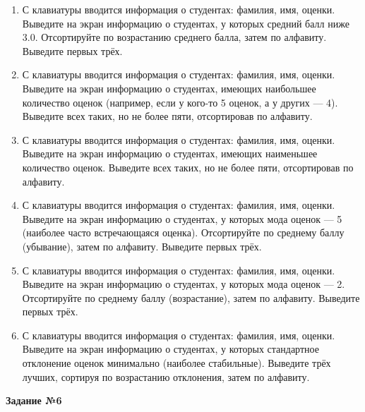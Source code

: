 \begin{enumerate}
\item С клавиатуры вводится информация о студентах: фамилия, имя, оценки. Выведите на экран информацию о студентах, у которых средний балл ниже 3.0. Отсортируйте по возрастанию среднего балла, затем по алфавиту. Выведите первых трёх.
\item С клавиатуры вводится информация о студентах: фамилия, имя, оценки. Выведите на экран информацию о студентах, имеющих наибольшее количество оценок (например, если у кого-то 5 оценок, а у других — 4). Выведите всех таких, но не более пяти, отсортировав по алфавиту.
\item С клавиатуры вводится информация о студентах: фамилия, имя, оценки. Выведите на экран информацию о студентах, имеющих наименьшее количество оценок. Выведите всех таких, но не более пяти, отсортировав по алфавиту.
\item С клавиатуры вводится информация о студентах: фамилия, имя, оценки. Выведите на экран информацию о студентах, у которых мода оценок — 5 (наиболее часто встречающаяся оценка). Отсортируйте по среднему баллу (убывание), затем по алфавиту. Выведите первых трёх.
\item С клавиатуры вводится информация о студентах: фамилия, имя, оценки. Выведите на экран информацию о студентах, у которых мода оценок — 2. Отсортируйте по среднему баллу (возрастание), затем по алфавиту. Выведите первых трёх.
\item С клавиатуры вводится информация о студентах: фамилия, имя, оценки. Выведите на экран информацию о студентах, у которых стандартное отклонение оценок минимально (наиболее стабильные). Выведите трёх лучших, сортируя по возрастанию отклонения, затем по алфавиту.
\end{enumerate}

\textbf{Задание №6}

